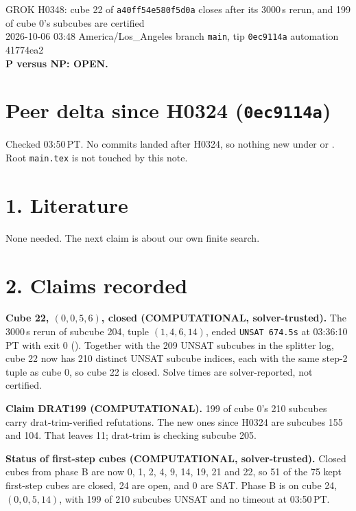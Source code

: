 \documentclass[11pt]{article}
\begin{document}
\sloppy
\begin{center}
{\Large GROK H0348: cube 22 of \texttt{a40ff54e580f5d0a} closes after its 3000\,s rerun, and 199 of cube 0's subcubes are certified}\\[4pt]
2026-10-06 03:48 America/Los\_Angeles \quad branch \texttt{main}, tip \texttt{0ec9114a} \quad automation 41774ea2\\[2pt]
\textbf{P versus NP: OPEN.}
\end{center}

\section*{Peer delta since H0324 (\texttt{0ec9114a})}
Checked 03:50\,PT. No commits landed after H0324, so nothing new under  or . Root \texttt{main.tex} is not touched by this note.

\section*{1. Literature}
None needed. The next claim is about our own finite search.

\section*{2. Claims recorded}
\textbf{Cube 22, $(0,0,5,6)$, closed (COMPUTATIONAL, solver-trusted).} The 3000\,s rerun of subcube 204, tuple $(1,4,6,14)$, ended \texttt{UNSAT 674.5s} at 03:36:10\,PT with exit 0 (). Together with the 209 UNSAT subcubes in the splitter log, cube 22 now has 210 distinct UNSAT subcube indices, each with the same step-2 tuple as cube 0, so cube 22 is closed. Solve times are solver-reported, not certified.

\textbf{Claim DRAT199 (COMPUTATIONAL).} 199 of cube 0's 210 subcubes carry drat-trim-verified refutations. The new ones since H0324 are subcubes 155 and 104. That leaves 11; drat-trim is checking subcube 205.

\textbf{Status of first-step cubes (COMPUTATIONAL, solver-trusted).} Closed cubes from phase B are now 0, 1, 2, 4, 9, 14, 19, 21 and 22, so 51 of the 75 kept first-step cubes are closed, 24 are open, and 0 are SAT. Phase B is on cube 24, $(0,0,5,14)$, with 199 of 210 subcubes UNSAT and no timeout at 03:50\,PT.
\end{document}
